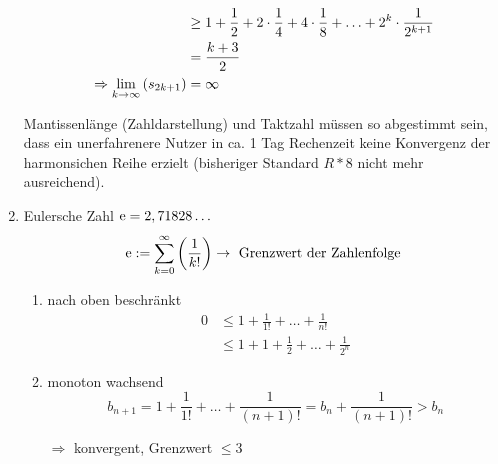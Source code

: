 \begin{example}[Anwendungen]
\begin{enumerate}
\begin{align*}
      &\geq 1 + \frac 1 2 + 2 \cdot \frac 1 4 + 4 \cdot \frac 1 8 + \ldots + 2^k \cdot\frac 1 {2^{k+1}}\\
      &= \frac{k+3} 2 \\
      \Rightarrow \liminfty[k]{s_{2k+1}} &= \infty
    \end{align*}
    \begin{note}
      Mantissenlänge (Zahldarstellung) und Taktzahl müssen so abgestimmt sein, dass ein unerfahrenere Nutzer in ca. 1 Tag Rechenzeit keine Konvergenz der harmonsichen Reihe erzielt (bisheriger Standard $R \ast 8$ nicht mehr ausreichend).
    \end{note}
  \item Eulersche Zahl $\euler = 2,71828\ldots$
    \begin{equation*}
      \euler := \sum\limits_{k=0}^\infty \left( \frac 1 {k!} \right) \rightarrow \text{ Grenzwert der Zahlenfolge}
    \end{equation*}
    \begin{enumerate}
      \item nach oben beschränkt
        \begin{align*}
          0 &\leq 1 + \frac 1 {1!} + \ldots + \frac 1 {n!} \\
          &\leq 1+1+\frac 1 2 + \ldots + \frac 1 {2^n}
        \end{align*}
      \item monoton wachsend
        \begin{equation*}
          b_{n+1} = 1 + \frac 1 {1!} + \ldots + \frac 1 {(n+1)!} = b_n + \frac 1 {(n+1)!} > b_n
        \end{equation*}
      \item[$\Rightarrow$] konvergent, Grenzwert $\leq 3$
    \end{enumerate}

\end{enumerate}

\end{example}